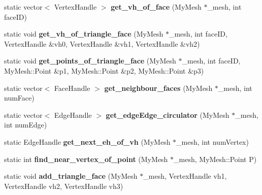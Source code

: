 \begin{DoxyCompactItemize}
\item 
\mbox{\label{classUtilsMesh_a78b1d3eae8fb732b329ded324a8a945a}} 
static vector$<$ Vertex\+Handle $>$ {\bfseries get\+\_\+vh\+\_\+of\+\_\+face} (My\+Mesh $\ast$\+\_\+mesh, int face\+ID)
\item 
\mbox{\label{classUtilsMesh_ab917829a3ca0e3ec4aacad5ca920755b}} 
static void {\bfseries get\+\_\+vh\+\_\+of\+\_\+triangle\+\_\+face} (My\+Mesh $\ast$\+\_\+mesh, int face\+ID, Vertex\+Handle \&vh0, Vertex\+Handle \&vh1, Vertex\+Handle \&vh2)
\item 
\mbox{\label{classUtilsMesh_a6bf821f4b60630010b30929ff08df8ef}} 
static void {\bfseries get\+\_\+points\+\_\+of\+\_\+triangle\+\_\+face} (My\+Mesh $\ast$\+\_\+mesh, int face\+ID, My\+Mesh\+::\+Point \&p1, My\+Mesh\+::\+Point \&p2, My\+Mesh\+::\+Point \&p3)
\item 
\mbox{\label{classUtilsMesh_ae90e0778536a6b84028765d0fa94c1d5}} 
static vector$<$ Face\+Handle $>$ {\bfseries get\+\_\+neighbour\+\_\+faces} (My\+Mesh $\ast$\+\_\+mesh, int num\+Face)
\item 
\mbox{\label{classUtilsMesh_aaaa320f02cba619c3879278d3a71defc}} 
static vector$<$ Edge\+Handle $>$ {\bfseries get\+\_\+edge\+Edge\+\_\+circulator} (My\+Mesh $\ast$\+\_\+mesh, int num\+Edge)
\item 
\mbox{\label{classUtilsMesh_ad303b77cd61c61bac06680b3afca72bf}} 
static Edge\+Handle {\bfseries get\+\_\+next\+\_\+eh\+\_\+of\+\_\+vh} (My\+Mesh $\ast$\+\_\+mesh, int num\+Vertex)
\item 
\mbox{\label{classUtilsMesh_a91d7084f562bb9da88164546fbf738ec}} 
static int {\bfseries find\+\_\+near\+\_\+vertex\+\_\+of\+\_\+point} (My\+Mesh $\ast$\+\_\+mesh, My\+Mesh\+::\+Point P)
\item 
\mbox{\label{classUtilsMesh_ad786014e4009f7763e8efc2e330a6432}} 
static void {\bfseries add\+\_\+triangle\+\_\+face} (My\+Mesh $\ast$\+\_\+mesh, Vertex\+Handle vh1, Vertex\+Handle vh2, Vertex\+Handle vh3)
\item 
\mbox{\label{classUtilsMesh_a5b273e1b0bc46b953a3ab563cb214797}} 

\end{DoxyCompactItemize}
